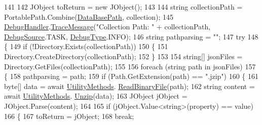 \begin{DoxyCode}
141 
142             JObject toReturn = \textcolor{keyword}{new} JObject();
143 
144             \textcolor{keywordtype}{string} collectionPath = PortablePath.Combine(\mbox{\hyperlink{class_little_weeb_library_1_1_handlers_1_1_data_base_handler_aeea801d75a8294727c8b8e2805b43abb}{DataBasePath}}, collection);
145             \mbox{\hyperlink{class_little_weeb_library_1_1_handlers_1_1_data_base_handler_aa474a1f934032623ffb3ae5eb156148b}{DebugHandler}}.\mbox{\hyperlink{interface_little_weeb_library_1_1_handlers_1_1_i_debug_handler_a2e405bc3492e683cd3702fae125221bc}{TraceMessage}}(\textcolor{stringliteral}{"Collection Path: "} + collectionPath, 
      \mbox{\hyperlink{namespace_little_weeb_library_1_1_handlers_a2a6ca0775121c9c503d58aa254d292be}{DebugSource}}.TASK, \mbox{\hyperlink{namespace_little_weeb_library_1_1_handlers_ab66019ed40462876ec4e61bb3ccb0a62}{DebugType}}.INFO);
146             \textcolor{keywordtype}{string} pathparsing = \textcolor{stringliteral}{""};
147             \textcolor{keywordflow}{try}
148             \{
149                 \textcolor{keywordflow}{if} (!Directory.Exists(collectionPath))
150                 \{
151                     Directory.CreateDirectory(collectionPath);
152                 \}
153 
154                 \textcolor{keywordtype}{string}[] jsonFiles = Directory.GetFiles(collectionPath);
155 
156                 \textcolor{keywordflow}{foreach} (\textcolor{keywordtype}{string} path \textcolor{keywordflow}{in} jsonFiles)
157                 \{
158                     pathparsing = path;
159                     \textcolor{keywordflow}{if} (Path.GetExtension(path) == \textcolor{stringliteral}{".jzip"})
160                     \{
161                         byte[] data = await \mbox{\hyperlink{class_little_weeb_library_1_1_static_classes_1_1_utility_methods}{UtilityMethods}}.
      \mbox{\hyperlink{class_little_weeb_library_1_1_static_classes_1_1_utility_methods_a7b5de7a3ecc749b655fc3ed2af55360b}{ReadBinaryFile}}(path);
162                         \textcolor{keywordtype}{string} content = await \mbox{\hyperlink{class_little_weeb_library_1_1_static_classes_1_1_utility_methods}{UtilityMethods}}.
      \mbox{\hyperlink{class_little_weeb_library_1_1_static_classes_1_1_utility_methods_a0a86ee01a3bf201bd9cc9b2552e54976}{Unzip}}(data);
163                         JObject jObject = JObject.Parse(content);
164 
165                         \textcolor{keywordflow}{if} (jObject.Value<\textcolor{keywordtype}{string}>(property) == value)
166                         \{
167                             toReturn = jObject;
168                             \textcolor{keywordflow}{break};

\end{DoxyCode}
